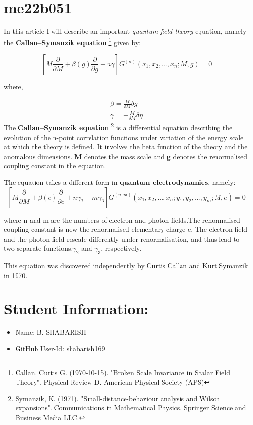 \section*{me22b051}
In this article I will describe an important \textit{quantum field theory} equation, namely the \textbf{Callan–Symanzik equation} \footnote[1]{Callan, Curtis G. (1970-10-15). "Broken Scale Invariance in Scalar Field Theory". Physical Review D. American Physical Society (APS)} given by:

\begin{equation}
\left[  M\frac{\partial }{\partial M} + \beta\left( g \right)\frac{\partial }{\partial g}+n\gamma  \right]G^{\left(n\right)} \left( x_{1},x_{2},...,x_{n};M,g\right)=0 
\end{equation}



where,

\begin{eqnarray}
\beta=\frac{M}{\delta M} \delta g 
\\ \gamma=-\frac{M}{\delta M} \delta \eta
\end{eqnarray}
The \textbf{Callan–Symanzik equation} \footnote[2]{Symanzik, K. (1971). "Small-distance-behaviour analysis and Wilson expansions". Communications in Mathematical Physics. Springer Science and Business Media LLC.} is a differential equation describing the evolution of the n-point correlation functions under variation of the energy scale at which the theory is defined. It involves the beta function of the theory and the anomalous dimensions. \textbf{M} denotes the mass scale and \textbf{g} denotes the renormalised coupling constant in the equation.

The equation takes a different form in \textbf{quantum electrodynamics}, namely:
\begin{equation}
\left[  M\frac{\partial }{\partial M} + \beta\left( e \right)\frac{\partial }{\partial e}+n\gamma_2+m\gamma_3  \right]G^{\left(n,m\right)} \left( x_{1},x_{2},...,x_{n};y_{1},y_{2},...,y_{m};M,e\right)=0 
\end{equation}

where n and m are the numbers of electron and photon fields.The renormalised coupling constant is now the renormalised elementary charge e. The electron field and the photon field rescale differently under renormalisation, and thus lead to two separate functions,$\gamma_{2}$ and $\gamma_{3}$, respectively.

This equation was discovered independently by Curtis Callan and Kurt Symanzik in 1970. 

\section*{Student Information:}
\begin{itemize}
    \item Name: B. SHABARISH 
    \item GitHub User-Id: shabarish169
\end{itemize}
